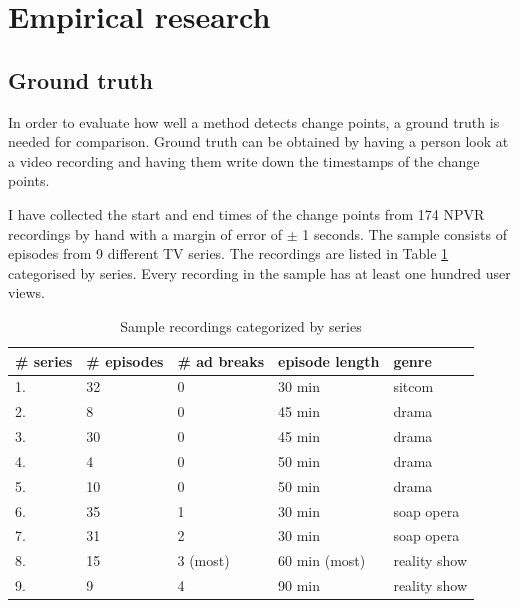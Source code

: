 

\section{Empirical research} \label{sec:casestudy}

\subsection{Ground truth} \label{subsec:groundtruth} %

In order to evaluate how well a method detects change points, a ground truth is needed for comparison. Ground truth can be obtained by having a person look at a video recording and having them write down the timestamps of the change points.

I have collected the start and end times of the change points from 174 NPVR recordings by hand with a margin of error of $\pm$ 1 seconds. The sample consists of episodes from 9 different TV series. The recordings are listed in Table \ref{tab:data} categorised by series. Every recording in the sample has at least one hundred user views.

\begin{table}[h]
    \begin{center}
    \begin{tabular}{|p{15mm}|p{20mm}|p{22mm}|p{28mm}|p{30mm}|} %
        \hline
        \textbf{\# series} & \textbf{\# episodes} & \textbf{\# ad breaks} & \textbf{episode length} & \textbf{genre}  \\ \hline
        1. & 32 & 0 & 30 min & sitcom\\ \hline
        2. &  8 & 0 & 45 min & drama\\ \hline
        3. & 30 & 0 & 45 min & drama\\ \hline
        4. & 4  & 0 & 50 min & drama\\ \hline
        5. & 10 & 0 & 50 min & drama\\ \hline
        6. & 35 & 1 & 30 min & soap opera\\ \hline
        7. & 31 & 2 & 30 min & soap opera\\ \hline
        8. & 15 & 3 (most) & 60 min (most) & reality show\\ \hline
        9. &  9 & 4 & 90 min & reality show\\ \hline
    \end{tabular}
    \end{center}
    \caption{Sample recordings categorized by series}
    \label{tab:data}
\end{table}

